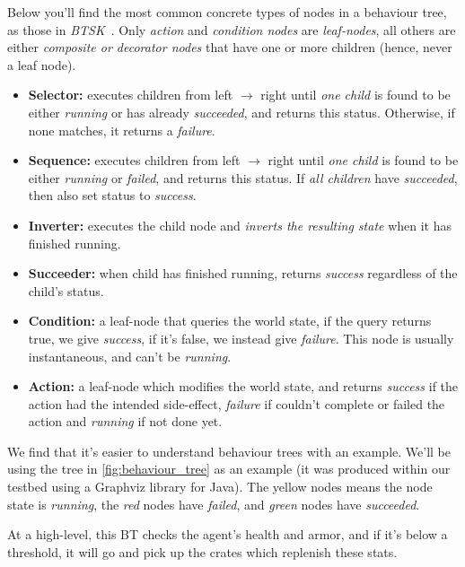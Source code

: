 \documentclass[a4paper, twocolumn]{article}
\begin{document}
        Below you'll find the most common concrete types of nodes in a behaviour tree, as those in \emph{BTSK}~\cite{champandard2014behaviour}. Only \emph{action} and \emph{condition nodes} are \emph{leaf-nodes}, all others are either \emph{composite or decorator nodes} that have one or more children (hence, never a leaf node).

        \begin{itemize}
            \item{\textbf{Selector:} executes children from left \(\rightarrow\) right until \emph{one child} is found to be either \emph{running} or has already \emph{succeeded}, and returns this status. Otherwise, if none matches, it returns a \emph{failure}.}
            \item{\textbf{Sequence:} executes children from left \(\rightarrow\) right until \emph{one child} is found to be either \emph{running} or \emph{failed}, and returns this status. If \emph{all children} have \emph{succeeded}, then also set status to \emph{success}.}
            \item{\textbf{Inverter:} executes the child node and \emph{inverts the resulting state} when it has finished running.}
            \item{\textbf{Succeeder:} when child has finished running, returns \emph{success} regardless of the child's status.}
            \item{\textbf{Condition:} a leaf-node that queries the world state, if the query returns true, we give \emph{success}, if it's false, we instead give \emph{failure}. This node is usually instantaneous, and can't be \emph{running}.}
            \item{\textbf{Action:} a leaf-node which modifies the world state, and returns \emph{success} if the action had the intended side-effect, \emph{failure} if couldn't complete or failed the action and \emph{running} if not done yet.}

        \end{itemize}

        We find that it's easier to understand behaviour trees with an example. We'll be using the tree in \cref{fig:behaviour_tree} as an example (it was produced within our testbed using a Graphviz library for Java). The yellow nodes means the node state is \emph{running}, the \emph{red} nodes have \emph{failed}, and \emph{green} nodes have \emph{succeeded}.

        At a high-level, this BT checks the agent's health and armor, and if it's below a threshold, it will go and pick up the crates which replenish these stats.
\end{document}
